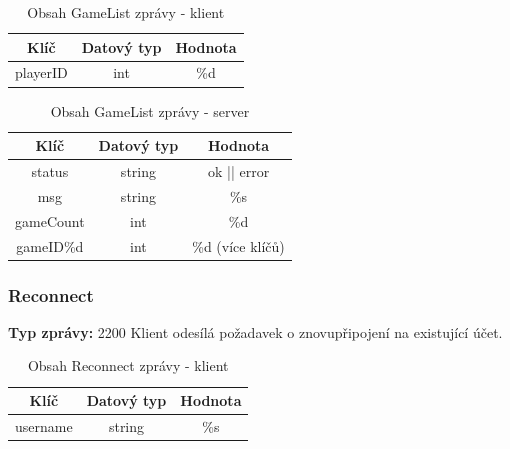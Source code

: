 \documentclass[12pt, a4paper]{article}
\begin{document}
    \begin{table}[H]
        \centering
        \begin{tabular}{|c|c|c|}
            \hline
            Klíč & Datový typ & Hodnota \\
            \hline
            \hline
            playerID & int & \%d \\
            \hline
        \end{tabular}
        \caption{Obsah GameList zprávy - klient}
    \end{table}

    \begin{table}[H]
        \centering
        \begin{tabular}{|c|c|c|}
            \hline
            Klíč & Datový typ & Hodnota \\
            \hline
            \hline
            status & string & ok || error \\
            \hline
            msg & string & \%s \\
            \hline
            gameCount & int & \%d \\
            \hline
            gameID\%d & int & \%d (více klíčů) \\
            \hline
        \end{tabular}
        \caption{Obsah GameList zprávy - server}
    \end{table}

\subsubsection{Reconnect}
\textbf{Typ zprávy: } 2200 \newline
Klient odesílá požadavek o znovupřipojení na existující účet. \newline

    \begin{table}[H]
        \centering
        \begin{tabular}{|c|c|c|}
            \hline
            Klíč & Datový typ & Hodnota \\
            \hline
            \hline
            username & string & \%s \\
            \hline
        \end{tabular}
        \caption{Obsah Reconnect zprávy - klient}
    \end{table}
\end{document}
